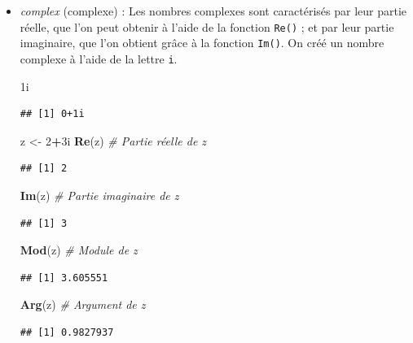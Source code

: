 \documentclass[
  11pt,
]{book}
\newenvironment{Shaded}{\begin{snugshade}}{\end{snugshade}}
\newcommand{\CommentTok}[1]{\textcolor[rgb]{0.56,0.35,0.01}{\textit{#1}}}
\newcommand{\DecValTok}[1]{\textcolor[rgb]{0.00,0.00,0.81}{#1}}
\newcommand{\KeywordTok}[1]{\textcolor[rgb]{0.13,0.29,0.53}{\textbf{#1}}}
\newcommand{\NormalTok}[1]{#1}
\newcommand{\OperatorTok}[1]{\textcolor[rgb]{0.81,0.36,0.00}{\textbf{#1}}}
\newcommand{\StringTok}[1]{\textcolor[rgb]{0.31,0.60,0.02}{#1}}
\numberwithin{equation}{section}
\numberwithin{countremarque}{section}
\begin{document}
\begin{itemize}
\item
  \emph{complex} (complexe) :
  Les nombres complexes sont caractérisés par leur partie réelle, que l'on peut obtenir à l'aide de la fonction \texttt{Re()} ; et par leur partie imaginaire, que l'on obtient grâce à la fonction \texttt{Im()}. On créé un nombre complexe à l'aide de la lettre \texttt{i}.

\begin{Shaded}
\begin{Highlighting}[]
\NormalTok{1i}
\end{Highlighting}
\end{Shaded}

\begin{lstlisting}
## [1] 0+1i
\end{lstlisting}

\begin{Shaded}
\begin{Highlighting}[]
\NormalTok{z \textless{}{-}}\StringTok{ }\DecValTok{2}\OperatorTok{+}\NormalTok{3i}
\KeywordTok{Re}\NormalTok{(z) }\CommentTok{\# Partie réelle de z}
\end{Highlighting}
\end{Shaded}

\begin{lstlisting}
## [1] 2
\end{lstlisting}

\begin{Shaded}
\begin{Highlighting}[]
\KeywordTok{Im}\NormalTok{(z) }\CommentTok{\# Partie imaginaire de z}
\end{Highlighting}
\end{Shaded}

\begin{lstlisting}
## [1] 3
\end{lstlisting}

\begin{Shaded}
\begin{Highlighting}[]
\KeywordTok{Mod}\NormalTok{(z) }\CommentTok{\# Module de z}
\end{Highlighting}
\end{Shaded}

\begin{lstlisting}
## [1] 3.605551
\end{lstlisting}

\begin{Shaded}
\begin{Highlighting}[]
\KeywordTok{Arg}\NormalTok{(z) }\CommentTok{\# Argument de z}
\end{Highlighting}
\end{Shaded}

\begin{lstlisting}
## [1] 0.9827937
\end{lstlisting}
\end{itemize}
\end{document}
